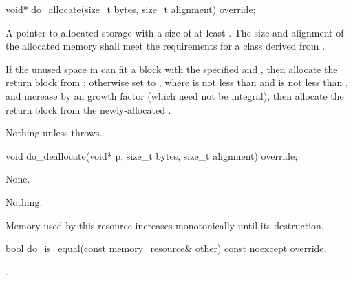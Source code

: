 %
\begin{itemdecl}
void* do_allocate(size_t bytes, size_t alignment) override;
\end{itemdecl}

\begin{itemdescr}
\pnum
\returns
A pointer to allocated storage
with a size of at least .
The size and alignment of the allocated memory shall meet the requirements
for a class derived from .

\pnum
\effects
If the unused space in 
can fit a block with the specified  and ,
then allocate the return block from ;
otherwise set  to ,
where  is not less than  and
 is not less than ,
and increase 
by an  growth factor (which need not be integral),
then allocate the return block from the newly-allocated .

\pnum
\throws
Nothing unless  throws.
\end{itemdescr}

%
\begin{itemdecl}
void do_deallocate(void* p, size_t bytes, size_t alignment) override;
\end{itemdecl}

\begin{itemdescr}
\pnum
\effects
None.

\pnum
\throws
Nothing.

\pnum
\remarks
Memory used by this resource increases monotonically until its destruction.
\end{itemdescr}

%
\begin{itemdecl}
bool do_is_equal(const memory_resource& other) const noexcept override;
\end{itemdecl}

\begin{itemdescr}
\pnum
\returns
{}.
\end{itemdescr}


